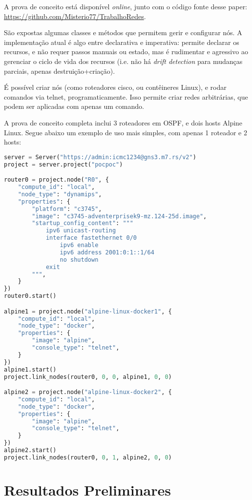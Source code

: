 \documentclass[12pt]{article}
\begin{document}
A prova de conceito está disponível \textit{online}, junto com o código fonte desse paper: \url{https://github.com/Misterio77/TrabalhoRedes}.

São expostas algumas classes e métodos que permitem gerir e configurar nós. A
implementação atual é algo entre declarativa e imperativa: permite declarar os
recursos, e não requer passos manuais ou estado, mas é rudimentar e agressivo
ao gerenciar o ciclo de vida dos recursos (i.e. não há \textit{drift detection}
para mudanças parciais, apenas destruição+criação).

É possível criar nós (como roteadores cisco, ou contêineres Linux), e rodar
comandos via telnet, programaticamente. Isso permite criar redes arbitrárias,
que podem ser aplicadas com apenas um comando.

A prova de conceito completa inclui 3 roteadores em OSPF, e dois hosts Alpine
Linux. Segue abaixo um exemplo de uso mais simples, com apenas 1 roteador e 2
hosts:

\begin{lstlisting}[language=Python]
server = Server("https://admin:icmc1234@gns3.m7.rs/v2")
project = server.project("pocpoc")

router0 = project.node("R0", {
    "compute_id": "local",
    "node_type": "dynamips",
    "properties": {
        "platform": "c3745",
        "image": "c3745-adventerprisek9-mz.124-25d.image",
        "startup_config_content": """
            ipv6 unicast-routing
            interface fastethernet 0/0
                ipv6 enable
                ipv6 address 2001:0:1::1/64
                no shutdown
            exit
        """,
    }
})
router0.start()

alpine1 = project.node("alpine-linux-docker1", {
    "compute_id": "local",
    "node_type": "docker",
    "properties": {
        "image": "alpine",
        "console_type": "telnet",
    }
})
alpine1.start()
project.link_nodes(router0, 0, 0, alpine1, 0, 0)

alpine2 = project.node("alpine-linux-docker2", {
    "compute_id": "local",
    "node_type": "docker",
    "properties": {
        "image": "alpine",
        "console_type": "telnet",
    }
})
alpine2.start()
project.link_nodes(router0, 0, 1, alpine2, 0, 0)
\end{lstlisting}

\section{Resultados Preliminares}
\end{document}
